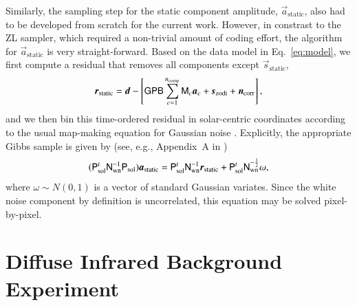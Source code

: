 \documentclass{aa}
\newcommand{\dv}[0]{\vec{d}}
\newcommand{\B}[0]{\tens{B}}
\renewcommand{\G}[0]{\tens{G}}
\newcommand{\n}[0]{\vec{n}}
\newcommand{\s}[0]{\vec{s}}
\renewcommand{\a}[0]{\vec{a}}
\newcommand{\N}[0]{\tens{N}}
\newcommand{\M}[0]{\tens{M}}
\renewcommand{\r}[0]{\vec{r}}
\renewcommand{\P}[0]{\tens{P}}
\begin{document}
Similarly, the sampling step for the static component amplitude,
$\a_{\mathrm{static}}$, also had to be developed from scratch for the
current work. However, in constrast to the ZL sampler, which required
a non-trivial amount of coding effort, the algorithm for
$\a_{\mathrm{static}}$ is very straight-forward. Based on the data
model in Eq.~\eqref{eq:model}, we first compute a residual that
removes all components except $\s_{\mathrm{static}}$,
\begin{equation}
  \r_{\mathrm{static}} = \dv - \left[\G\P\B\sum_{c=1}^{n_{\mathrm{comp}}}\M_c\a_c+\s_{\mathrm{zodi}} 
    + \n_\mathrm{corr}\right],
\end{equation}
and we then bin this time-ordered residual in solar-centric coordinates
according to the usual map-making equation for Gaussian noise
\citep[e.g.,][]{tegmark_mapmaking}. Explicitly, the appropriate
Gibbs sample is given by (see, e.g., Appendix~A in \citealp{bp01})
\begin{equation}
(\P_{\mathrm{sol}}^t\N_{\mathrm{wn}}^{-1}\P_{\mathrm{sol}})\a_{\mathrm{static}} 
  = \P_{\mathrm{sol}}^t\N_{\mathrm{wn}}^{-1}\r_{\mathrm{static}} + \P_{\mathrm{sol}}^t\N_{\mathrm{wn}}^{-\frac{1}{2}}\omega,
\end{equation}
where $\omega\sim N(0,1)$ is a vector of standard Gaussian
variates. Since the white noise component by definition is
uncorrelated, this equation may be solved pixel-by-pixel.



\section{Diffuse Infrared Background Experiment}
\label{sec:dirbe}
\end{document}
